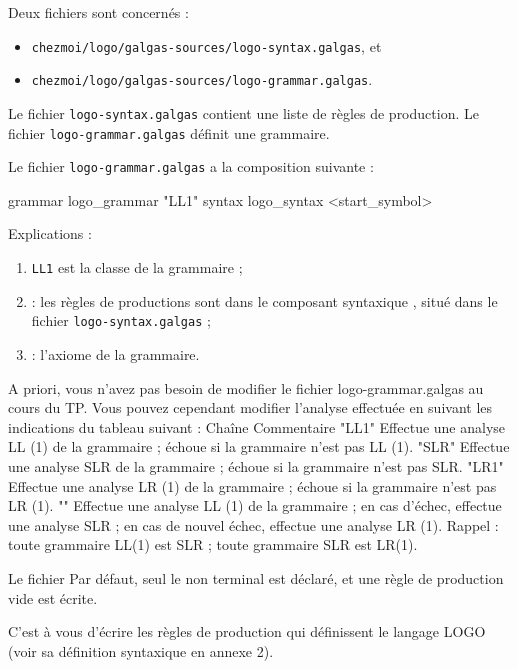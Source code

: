 Deux fichiers sont concernés :
\begin{itemize}
  \item \texttt{chezmoi/logo/galgas-sources/logo-syntax.galgas}, et
  \item \texttt{chezmoi/logo/galgas-sources/logo-grammar.galgas}.
\end{itemize}

Le fichier \texttt{logo-syntax.galgas} contient une liste de règles de production. Le fichier \texttt{logo-grammar.galgas} définit une grammaire.

Le fichier \texttt{logo-grammar.galgas} a la composition suivante :

\begin{galgascode}
grammar logo_grammar "LL1" {
  syntax logo_syntax
  <start_symbol>
}
\end{galgascode}

Explications :
\begin{enumerate}
  \item \texttt{LL1} est la classe de la grammaire ;
  \item {} : les règles de productions sont dans le composant syntaxique , situé dans le fichier \texttt{logo-syntax.galgas} ; 
  \item {} : l'axiome de la grammaire.
\end{enumerate}

A priori, vous n'avez pas besoin de modifier le fichier logo-grammar.galgas au cours du TP. Vous pouvez cependant modifier l'analyse effectuée en suivant les indications du tableau suivant :
Chaîne	Commentaire
"LL1"	Effectue une analyse LL (1) de la grammaire ; échoue si la grammaire n'est pas LL (1).
"SLR"	Effectue une analyse SLR de la grammaire ; échoue si la grammaire n'est pas SLR.
"LR1"	Effectue une analyse LR (1) de la grammaire ; échoue si la grammaire n'est pas LR (1).
""	Effectue une analyse LL (1) de la grammaire ; en cas d'échec, effectue une analyse SLR ; en cas de nouvel échec, effectue une analyse LR (1). 
Rappel :
toute grammaire LL(1) est SLR ;
toute grammaire SLR est LR(1).

Le fichier 
Par défaut, seul le non terminal  est déclaré, et une règle de production vide est écrite.

C'est à vous d'écrire les règles de production qui définissent le langage LOGO (voir sa définition syntaxique en annexe 2).


